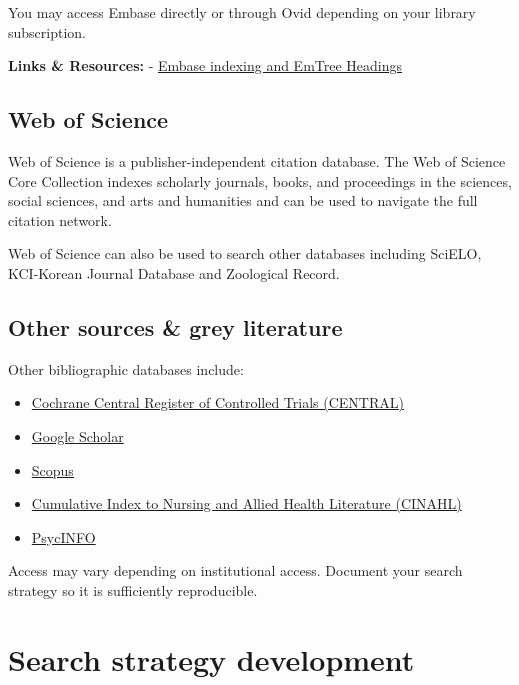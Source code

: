 \documentclass[
]{book}
\providecommand{\tightlist}{%
  \setlength{\itemsep}{0pt}\setlength{\parskip}{0pt}}
\begin{document}
You may access Embase directly or through Ovid depending on your library subscription.

\textbf{Links \& Resources:}
- \href{https://www.elsevier.com/solutions/embase-biomedical-research/embase-coverage-and-content}{Embase indexing and EmTree Headings}

\hypertarget{web-of-science}{%
\subsection{Web of Science}\label{web-of-science}}

Web of Science is a publisher-independent citation database. The Web of Science Core Collection indexes scholarly journals, books, and proceedings in the sciences, social sciences, and arts and humanities and can be used to navigate the full citation network.

Web of Science can also be used to search other databases including SciELO, KCI-Korean Journal Database and Zoological Record.

\hypertarget{other-sources-grey-literature}{%
\subsection{Other sources \& grey literature}\label{other-sources-grey-literature}}

Other bibliographic databases include:

\begin{itemize}
\tightlist
\item
  \href{https://www.cochranelibrary.com/central/about-central}{Cochrane Central Register of Controlled Trials (CENTRAL)}
\item
  \href{https://scholar.google.com/}{Google Scholar}
\item
  \href{https://www.scopus.com/home.uri}{Scopus}
\item
  \href{https://www.ebscohost.com/nursing/products/cinahl-databases/cinahl-complete}{Cumulative Index to Nursing and Allied Health Literature (CINAHL)}
\item
  \href{https://www.apa.org/pubs/databases/psycinfo}{PsycINFO}
\end{itemize}

Access may vary depending on institutional access. Document your search strategy so it is sufficiently reproducible.

\hypertarget{search-strategy-development}{%
\section{Search strategy development}\label{search-strategy-development}}
\end{document}
